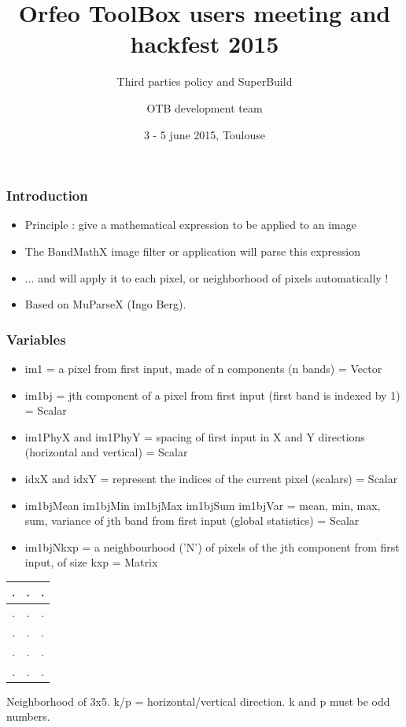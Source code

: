 \documentclass[8pt]{beamer}
\title{Orfeo ToolBox users meeting and hackfest 2015}
\subtitle{Third parties policy and SuperBuild}
\author{OTB development team}%
\date{3 - 5 june 2015, Toulouse}
\begin{document}
\begin{frame}
\titlepage
\end{frame}

\begin{frame}
\frametitle{Introduction}

\begin{itemize}
\item Principle : give a mathematical expression to be applied to an image
\item The BandMathX image filter or application will parse this expression
\item ... and will apply it to each pixel, or neighborhood of pixels automatically !
\item Based on MuParseX (Ingo Berg).
\end{itemize} 

\end{frame}

\begin{frame}
\frametitle{Variables}

\begin{itemize}
\item im1 =  a pixel from first input, made of n components (n bands) = Vector
\item im1bj = jth component of a pixel from first input (first band is indexed by 1) = Scalar
\item im1PhyX and im1PhyY = spacing of first input in X and Y directions (horizontal and vertical) = Scalar 
\item idxX and idxY = represent the indices of the current pixel (scalars) = Scalar
\item im1bjMean  im1bjMin  im1bjMax  im1bjSum  im1bjVar  = mean,  min,  max,  sum,  variance  of  jth band from first input (global statistics) = Scalar
\item im1bjNkxp = a neighbourhood (’N’) of pixels of the jth component from first input, of size kxp = Matrix 
\end{itemize}

\begin{center} 
\begin{tabular}{|c|c|c|}
\hline
.	& .	& . \\
\hline
.	& .	& . \\
\hline
.	& .	& . \\
\hline
.	& .	& . \\
\hline
.	& .	& . \\
\hline
\end{tabular}
\end{center}
\begin{center} 
\caption{Neighborhood of 3x5. k/p = horizontal/vertical direction. k and p must be odd numbers.}
\end{center}

\end{frame}
\end{document}
